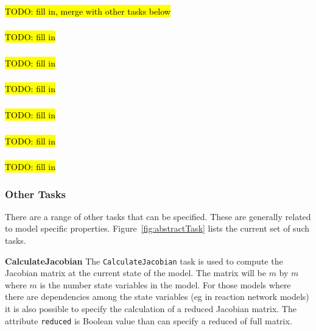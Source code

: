 \subsubsection{}
\label{class:calculateEigenvectors}
\hl{TODO: fill in, merge with other tasks below}

\subsubsection{}
\label{class:calculateEigenvalues}
\hl{TODO: fill in}

\subsubsection{}
\label{class:calculateJacobian}
\hl{TODO: fill in}

\subsubsection{}
\label{class:calculateStoichiometryMatrix}
\hl{TODO: fill in}

\subsubsection{}
\label{class:calculateElasticity}
\hl{TODO: fill in}

\subsubsection{}
\label{class:calculateLocalSensitivity}
\hl{TODO: fill in}

\subsubsection{}
\label{class:calculateMoietyConservationLaws}
\hl{TODO: fill in}

\subsubsection{Other Tasks}
There are a range of other tasks that can be specified. These are generally related to model specific properties. Figure~\ref{fig:abstractTask} lists the current set of such tasks. 

{\bf CalculateJacobian} The {\tt CalculateJacobian} task is used to compute the Jacobian matrix at the current state of the model. The matrix will be $m$ by $m$ where $m$ is the number state variables in the model. For those models where there are dependencies among the state variables (eg in reaction network models) it is also possible to specify the calculation of a reduced Jacobian matrix. The attribute {\tt reduced} is Boolean value than can specify a reduced of full matrix. 

